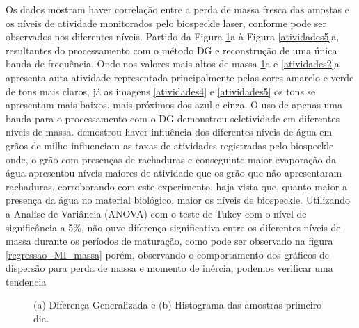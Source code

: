 \documentclass{elsarticle}
\begin{document}
Os dados mostram haver correlação entre a perda de massa fresca das amostas e os níveis de atividade monitorados pelo biospeckle laser, conforme pode ser observados nos diferentes níveis. Partido da Figura \ref{atividades1}a à Figura  \ref{atividades5}a, resultantes do processamento com o  método DG  e reconstrução de uma única banda de frequência. Onde nos valores mais altos de massa \ref{atividades1}a e  \ref{atividades2}a apresenta auta atividade representada principalmente pelas cores amarelo e verde de tons mais claros, já as imagens \ref{atividades4} e \ref{atividades5} os tons se apresentam mais baixos, mais próximos dos azul e cinza. O uso de apenas uma banda para o processamento com o DG demonstrou seletividade em diferentes níveis de massa. \citet{Cardoso2011} demostrou haver influência dos diferentes níveis de água em grãos de milho influenciam as taxas de atividades registradas pelo biospeckle onde, o grão com presenças de rachaduras e conseguinte maior evaporação da água apresentou níveis maiores de atividade que os grão que não apresentaram rachaduras, corroborando com este experimento, haja vista que, quanto maior a presença da água no material biológico,  maior os níveis de biospeckle. Utilizando a Analise de Variância (ANOVA) com o teste de Tukey com o nível de significância a 5\%, não ouve diferença significativa  entre os diferentes níveis de massa durante os períodos de maturação, como pode ser observado na figura \ref{regressao_MI_massa} porém, observando o comportamento dos gráficos de dispersão para perda de massa e momento de inércia, podemos verificar uma tendencia %




\begin{figure}[h!]  
\centering
{}
\qquad
{}
\caption{(a) Diferença Generalizada e (b) Histograma das amostras primeiro dia.}
\label{atividades1}
\end{figure}
\end{document}
